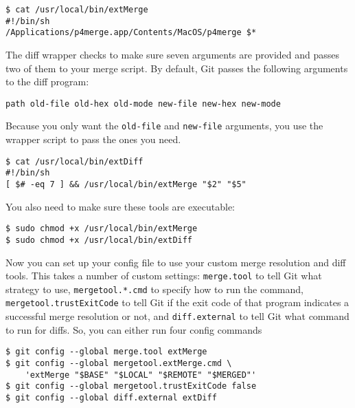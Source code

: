 \documentclass[a4paper]{book}
\newcounter{tab}[chapter]
\begin{document}
\begin{shaded}\begin{verbatim}
$ cat /usr/local/bin/extMerge
#!/bin/sh
/Applications/p4merge.app/Contents/MacOS/p4merge $*
\end{verbatim}\end{shaded}

The diff wrapper checks to make sure seven arguments are provided and passes two of them to your merge script. By default, Git passes the following arguments to the diff program:

\begin{shaded}\begin{verbatim}
path old-file old-hex old-mode new-file new-hex new-mode
\end{verbatim}\end{shaded}

Because you only want the \texttt{old-file} and \texttt{new-file} arguments, you use the wrapper script to pass the ones you need.

\begin{shaded}\begin{verbatim}
$ cat /usr/local/bin/extDiff
#!/bin/sh
[ $# -eq 7 ] && /usr/local/bin/extMerge "$2" "$5"
\end{verbatim}\end{shaded}

You also need to make sure these tools are executable:

\begin{shaded}\begin{verbatim}
$ sudo chmod +x /usr/local/bin/extMerge
$ sudo chmod +x /usr/local/bin/extDiff
\end{verbatim}\end{shaded}

Now you can set up your config file to use your custom merge resolution and diff tools. This takes a number of custom settings: \texttt{merge.tool} to tell Git what strategy to use, \texttt{mergetool.*.cmd} to specify how to run the command, \texttt{mergetool.trustExitCode} to tell Git if the exit code of that program indicates a successful merge resolution or not, and \texttt{diff.external} to tell Git what command to run for diffs. So, you can either run four config commands

\begin{shaded}\begin{verbatim}
$ git config --global merge.tool extMerge
$ git config --global mergetool.extMerge.cmd \
    'extMerge "$BASE" "$LOCAL" "$REMOTE" "$MERGED"'
$ git config --global mergetool.trustExitCode false
$ git config --global diff.external extDiff
\end{verbatim}\end{shaded}
\end{document}
